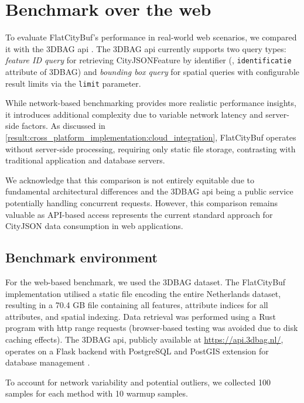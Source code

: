 \section{Benchmark over the web}
\label{result:benchmark_over_the_web}
To evaluate FlatCityBuf's performance in real-world web scenarios, we compared it with the 3DBAG \ac{api} \citep{3dbag_api}. The 3DBAG \ac{api} currently supports two query types: \textit{feature ID query} for retrieving CityJSONFeature by identifier (\eg, \texttt{identificatie} attribute of 3DBAG) and \textit{bounding box query} for spatial queries with configurable result limits via the \texttt{limit} parameter.

While network-based benchmarking provides more realistic performance insights, it introduces additional complexity due to variable network latency and server-side factors. As discussed in \autoref{result:cross_platform_implementation:cloud_integration}, FlatCityBuf operates without server-side processing, requiring only static file storage, contrasting with traditional application and database servers.

We acknowledge that this comparison is not entirely equitable due to fundamental architectural differences and the 3DBAG \ac{api} being a public service potentially handling concurrent requests. However, this comparison remains valuable as API-based access represents the current standard approach for CityJSON data consumption in web applications.

\subsection{Benchmark environment}
\label{result:benchmark_over_the_web:benchmark_environment}

For the web-based benchmark, we used the 3DBAG dataset. The FlatCityBuf implementation utilised a static file encoding the entire Netherlands dataset, resulting in a 70.4 GB file containing all features, attribute indices for all attributes, and spatial indexing. Data retrieval was performed using a Rust program with \ac{http} range requests (browser-based testing was avoided due to disk caching effects). The 3DBAG \ac{api}, publicly available at \url{https://api.3dbag.nl/}, operates on a Flask backend with PostgreSQL and PostGIS extension for database management \citep{powalka_2023}.

To account for network variability and potential outliers, we collected 100 samples for each method with 10 warmup samples.

